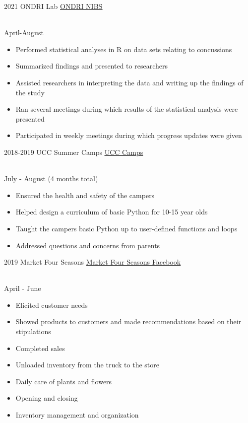\documentclass[]{cv-style}          %
\begin{document}
\begin{entrylist}
\entry
    {2021}
    {ONDRI Lab}
    {\href{https://ondri.ca/neurodegenerative-research/assessment-platforms/neuroinformatics-biostatistics-assessment-platform-ondri/}{\underline{ONDRI NIBS}}}
    {\\
    April-August
    \begin{itemize}
        \item Performed statistical analyses in R on data sets relating to concussions
        \item Summarized findings and presented to researchers
        \item Assisted researchers in interpreting the data and writing up the findings of the study
        \item Ran several meetings during which results of the statistical analysis were presented
        \item Participated in weekly meetings during which progress updates were given
    \end{itemize}
    }
\entry
    {2018-2019}
    {UCC Summer Camps}
    {\href{https://www.ucc.on.ca/summer/summer-camps}{\underline{UCC Camps}}}
    {\\
    July - August (4 months total)
    \begin{itemize}
     \item Ensured the health and safety of the campers
     \item Helped design a curriculum of basic Python for 10-15 year olds
     \item Taught the campers basic Python up to user-defined functions and loops
     \item Addressed questions and concerns from parents
    \end{itemize}}

\entry
  {2019}
  {Market Four Seasons}
  {\href{https://www.facebook.com/pages/Market-Four-Seasons-Inc/657595777714692}
            {\underline{Market Four Seasons Facebook}}}
  {\\
  April - June
  \begin{itemize}
    \item Elicited customer needs
     \item Showed products to customers and made recommendations based on their stipulations
     \item Completed sales
     \item Unloaded inventory from the truck to the store
     \item Daily care of plants and flowers
     \item Opening and closing
     \item Inventory management and organization
  \end{itemize}}


\end{entrylist}
\end{document}
